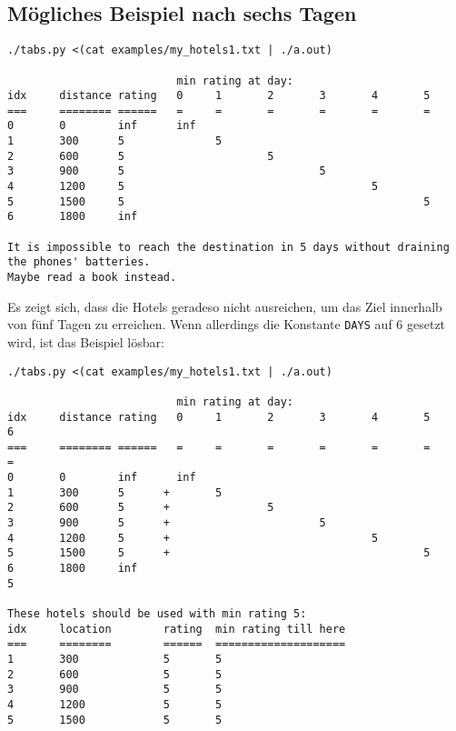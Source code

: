 \documentclass[a4paper,10pt,ngerman]{scrartcl}
\begin{document}
\subsection*{Mögliches Beispiel nach sechs Tagen}
\begin{lstlisting}
./tabs.py <(cat examples/my_hotels1.txt | ./a.out)

                          min rating at day:
idx     distance rating   0     1       2       3       4       5
===     ======== ======   =     =       =       =       =       =
0       0        inf      inf
1       300      5              5
2       600      5                      5
3       900      5                              5
4       1200     5                                      5
5       1500     5                                              5
6       1800     inf

It is impossible to reach the destination in 5 days without draining the phones' batteries.
Maybe read a book instead.
\end{lstlisting}
Es zeigt sich, dass die Hotels geradeso nicht ausreichen, um das Ziel innerhalb von fünf Tagen zu erreichen.
Wenn allerdings die Konstante \lstinline{DAYS} auf $6$ gesetzt wird, ist das Beispiel lösbar:
\begin{lstlisting}
./tabs.py <(cat examples/my_hotels1.txt | ./a.out)

                          min rating at day:
idx     distance rating   0     1       2       3       4       5       6
===     ======== ======   =     =       =       =       =       =       =
0       0        inf      inf
1       300      5      +       5
2       600      5      +               5
3       900      5      +                       5
4       1200     5      +                               5
5       1500     5      +                                       5
6       1800     inf                                                    5

These hotels should be used with min rating 5:
idx     location        rating  min rating till here
===     ========        ======  ====================
1       300             5       5
2       600             5       5
3       900             5       5
4       1200            5       5
5       1500            5       5
\end{lstlisting}
\end{document}

